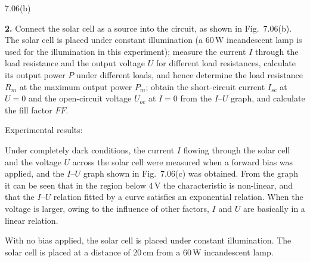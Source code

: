 \begin{figbox}{7.06(b)}
\end{figbox}

\textbf{2.} Connect the solar cell as a source into the circuit, as shown in Fig.~7.06(b). The solar cell is placed under constant illumination (a 60\,W incandescent lamp is used for the illumination in this experiment); measure the current $I$ through the load resistance and the output voltage $U$ for different load resistances, calculate its output power $P$ under different loads, and hence determine the load resistance $R_m$ at the maximum output power $P_m$; obtain the short-circuit current $I_{sc}$ at $U=0$ and the open-circuit voltage $U_{oc}$ at $I=0$ from the $I$--$U$ graph, and calculate the fill factor $FF$.

Experimental results:

Under completely dark conditions, the current $I$ flowing through the solar cell and the voltage $U$ across the solar cell were measured when a forward bias was applied, and the $I$--$U$ graph shown in Fig.~7.06(c) was obtained. From the graph it can be seen that in the region below 4\,V the characteristic is non-linear, and that the $I$--$U$ relation fitted by a curve satisfies an exponential relation. When the voltage is larger, owing to the influence of other factors, $I$ and $U$ are basically in a linear relation.

With no bias applied, the solar cell is placed under constant illumination. The solar cell is placed at a distance of 20\,cm from a 60\,W incandescent lamp.

